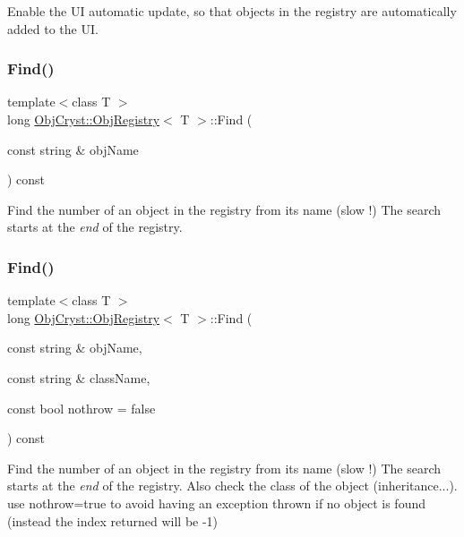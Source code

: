 Enable the UI automatic update, so that objects in the registry are automatically added to the UI. \mbox{\label{class_obj_cryst_1_1_obj_registry_a712fede2be32673dcd92b7f2fb1779d6}} 
\subsubsection{\texorpdfstring{Find()}{Find()}\hspace{0.1cm}{\footnotesize\ttfamily [1/4]}}
{\footnotesize\ttfamily template$<$class T $>$ \\
long \mbox{\hyperlink{class_obj_cryst_1_1_obj_registry}{Obj\+Cryst\+::\+Obj\+Registry}}$<$ T $>$\+::Find (\begin{DoxyParamCaption}\item[{const string \&}]{obj\+Name }\end{DoxyParamCaption}) const}

Find the number of an object in the registry from its name (slow !) The search starts at the {\itshape end} of the registry. \mbox{\label{class_obj_cryst_1_1_obj_registry_a84c4ae3459936ac2f8f9c87f7bb95923}} 
\subsubsection{\texorpdfstring{Find()}{Find()}\hspace{0.1cm}{\footnotesize\ttfamily [2/4]}}
{\footnotesize\ttfamily template$<$class T $>$ \\
long \mbox{\hyperlink{class_obj_cryst_1_1_obj_registry}{Obj\+Cryst\+::\+Obj\+Registry}}$<$ T $>$\+::Find (\begin{DoxyParamCaption}\item[{const string \&}]{obj\+Name,  }\item[{const string \&}]{class\+Name,  }\item[{const bool}]{nothrow = {\ttfamily false} }\end{DoxyParamCaption}) const}

Find the number of an object in the registry from its name (slow !) The search starts at the {\itshape end} of the registry. Also check the class of the object (inheritance...). use nothrow=true to avoid having an exception thrown if no object is found (instead the index returned will be -\/1) \mbox{\label{class_obj_cryst_1_1_obj_registry_ac6755dd7352567c2da151276f81d346d}} 
